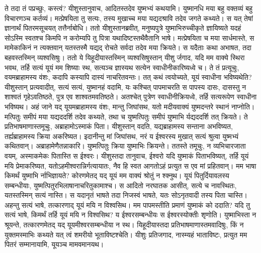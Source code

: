 \vakya ते तदा तं पप्रच्छुः, कस्त्वं? यीशुस्तानुवाच, आदितस्तदेव युष्मभ्यं कथयामि।
\vakya युष्मानधि मया बहु वक्तव्यं बहु विचारणञ्च कर्तव्यं। मत्प्रेषयिता तु सत्यः, तस्य मुखाच्च मया यद्यदश्रावि तदेव जगते कथ्यते।
\vakya स यत् तेषां ज्ञानार्थं पितरमसूचयत् तत्तैर्नाबोधि।
\vakya ततो यीशुस्तानब्रवीत्, मनुष्यपुत्रे युष्माभिरुच्चीकृते ज्ञायिष्यते यदहं सोऽस्मि स्वतश्च किमपि न करोम्यपि तु पित्रा यथादिष्टस्तथैवैतानि भाषे।
\vakya मत्प्रेषयिता च मया सार्धमास्ते, स मामेकाकिनं न त्यक्तवान् यतस्तस्मै यद्यद् रोचते सर्वदा तदेव मया क्रियते।
\vakya स यदैताः कथा अभाषत, तदा बहवस्तस्मिन् व्यश्वसिषुः।
\vakya ततो ये यिहूदीयास्तस्मिन् व्यश्वसिषुस्तान् यीशु र्जगाद, यदि मम वाक्ये स्थिरा भवथ, तर्हि सत्यं यूयं मम शिष्याः स्थ,
\vakya सत्यञ्च ज्ञास्यथ सत्येन स्वाधीनीकारिष्यध्वे च।
\vakya ते तं प्रत्यूचुः, वयमब्राहामस्य वंशः, कदापि कस्यापि दास्यं नाचरितवन्तः। तत् कथं त्वयोच्यते, यूयं स्वाधीना भविष्यथेति?
\vakya यीशुस्तान् प्रत्यवादीत्, सत्यं सत्यं, युष्मानहं वदामि, यः कश्चित् पापमाचरति स पापस्य दासः,
\vakya दासस्तु न शाश्वतं गृहेऽवतिष्ठते, पुत्र एव शाश्वतमवतिष्ठते।
\vakya अतश्चेत् पुत्रेण स्वाधीनीक्रियध्वे, तर्हि सत्यरूपेण स्वाधीना भविष्यथ।
\vakya अहं जाने यद् यूयमब्राहामस्य वंशः, मान्तु जिघांसथ, यतो मदीयवाक्यं युष्मदन्तरे स्थानं नाप्नोति।
\vakya मत्पितुः समीपं मया यद्यददर्शि तदेव कथ्यते, तथा च युष्मत्पितुः समीपं युष्माभि र्यद्यददर्शि तत् क्रियते।
\vakya ते प्रतिभाषमाणास्तमूचुः, अब्राहामोऽस्माकं पिता। यीशुस्तान् वदति, यद्यब्राहामस्य सन्ताना अभविष्यत, तर्ह्यब्राहामस्य क्रिया अकरिष्यत।
\vakya इदानीन्तु मां जिघांसथ, नरं य ईश्वरस्य मुखात् सत्यं श्रुत्वा युष्मभ्यं कथितवान्। अब्राहामेणैतन्नाकारि।
\vakya युष्मत्पितुः क्रिया युष्माभिः क्रियन्ते। ततस्ते तमूचुः, न व्यभिचारजाता वयम्, अस्माकमेकः पितास्ति स ईश्वरः।
\vakya यीशुस्तदा तानुवाच, ईश्वरो यदि युष्माकं पिताभविष्यत्, तर्हि यूयं मयि प्रेमाकरिष्यत, यतोऽहमीश्वरान्निर्गत्यायातः, नैव हि स्वत आगतोऽहं प्रत्युत स एव मां प्रहितवान्।
\vakya मम भाषा किमर्थं युष्माभि र्नाभिज्ञायते? कोरणमेतद् यद् यूयं मम वाक्यं श्रोतुं न श्क्नुथ।
\vakya यूयं पितुर्दियावलस्य सम्बन्धीयाः, युष्मत्पितुरभिलाषानाचरितुकामाश्च। स आदितो नरघातक आसीत्, सत्ये च नावस्थितः, यतस्तस्मिन् सत्यं नास्ति। स यदानृतं भाषते तदा निजस्वं भाषते, यतः सोऽनृतवादी तस्य पिता चास्ति।
\vakya अहन्तु सत्यं भाषे, तत्कारणाद् यूयं मयि न विश्वसिथ।
\vakya मम पापमस्तीति प्रमाणं युष्माकं को ददाति? यदि तु सत्यं भाषे, किमर्थं तर्हि यूयं मयि न विश्वसिथ?
\vakya य ईश्वरसम्बन्धीयः स ईश्वरस्योक्तीः शृणोति। युष्माभिस्ता न श्रूयन्ते, तत्कारणमेतद् यद् यूयमीश्वरसम्बन्धीया न स्थ।
\vakya यिहूदीयास्तदा प्रतिभाषमाणास्तमवादिषुः, किं न युक्तमस्माभिः कथ्यते यत् त्वं शमरीयो भूताविष्टश्चेति।
\vakya यीशुः प्रतिजगाद, नास्म्यहं भाताविष्टः, प्रत्युत मम पितरं सम्मानायामि, यूयञ्च मामवमानयथ।

